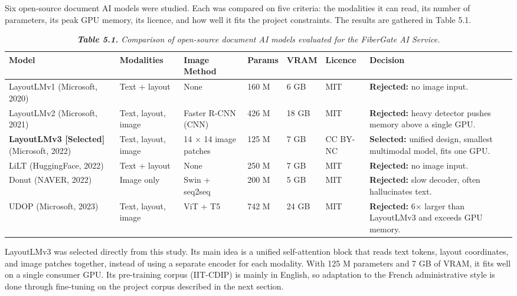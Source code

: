 Six open-source document AI models were studied. Each was compared on five criteria: the modalities it can read, its number of parameters, its peak GPU memory, its licence, and how well it fits the project constraints. The results are gathered in Table 5.1.

\begin{table}[H]
  \centering
  \caption{\textit{\textbf{Table 5.1.} Comparison of open-source document AI models evaluated for the FiberGate AI Service.}}
  \renewcommand{\arraystretch}{1.0}
  \footnotesize
  \begin{tabularx}{\textwidth}{|X|X|X|X|X|X|X|}
    \hline
    \textbf{Model} & \textbf{Modalities} & \textbf{Image Method} & \textbf{Params} & \textbf{VRAM} & \textbf{Licence} & \textbf{Decision} \\ \hline
    LayoutLMv1 (Microsoft, 2020) & Text + layout & None & 160 M & 6 GB & MIT & \textbf{Rejected:} no image input. \\ \hline
    LayoutLMv2 (Microsoft, 2021) & Text, layout, image & Faster R-CNN (CNN) & 426 M & 18 GB & MIT & \textbf{Rejected:} heavy detector pushes memory above a single GPU. \\ \hline
    \textbf{LayoutLMv3 [Selected]} (Microsoft, 2022) & Text, layout, image & 14 $\times$ 14 image patches & 125 M & 7 GB & CC BY-NC & \textbf{Selected:} unified design, smallest multimodal model, fits one GPU. \\ \hline
    LiLT (HuggingFace, 2022) & Text + layout & None & 250 M & 7 GB & MIT & \textbf{Rejected:} no image input. \\ \hline
    Donut (NAVER, 2022) & Image only & Swin + seq2seq & 200 M & 5 GB & MIT & \textbf{Rejected:} slow decoder, often hallucinates text. \\ \hline
    UDOP (Microsoft, 2023) & Text, layout, image & ViT + T5 & 742 M & 24 GB & MIT & \textbf{Rejected:} 6$\times$ larger than LayoutLMv3 and exceeds GPU memory. \\ \hline
  \end{tabularx}
\end{table}

LayoutLMv3 was selected directly from this study. Its main idea is a unified self-attention block that reads text tokens, layout coordinates, and image patches together, instead of using a separate encoder for each modality. With 125 M parameters and 7 GB of VRAM, it fits well on a single consumer GPU. Its pre-training corpus (IIT-CDIP) is mainly in English, so adaptation to the French administrative style is done through fine-tuning on the project corpus described in the next section.

